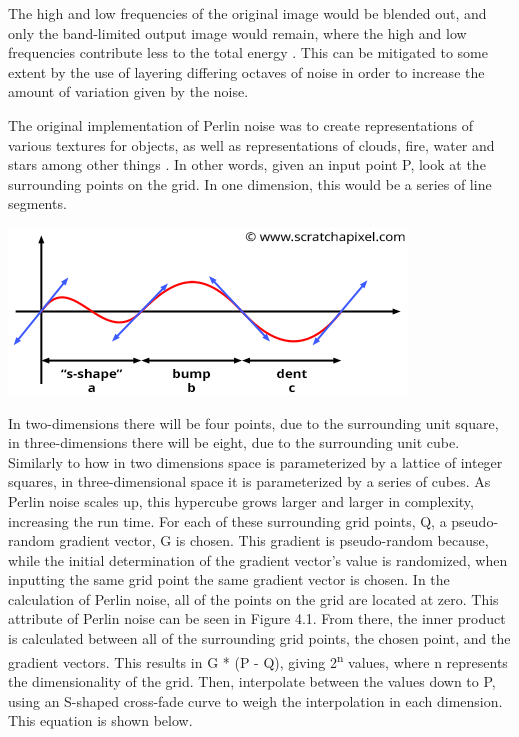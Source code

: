\documentclass[10pt]{report}
\begin{document}
		The high and low frequencies of the original image would be blended out, and only the band-limited output image would remain, where the high and low frequencies contribute less to the total energy \cite{making-noise}. This can be mitigated to some extent by the use of layering differing octaves of noise in order to increase the amount of variation given by the noise. 
		
		The original implementation of Perlin noise was to create representations of various textures for objects, as well as representations of clouds, fire, water and stars among other things \cite{10.1145/325165.325247}. In other words, given an input point P, look at the surrounding points on the grid. In one dimension, this would be a series of line segments. 

		\begin{minipage}{\textwidth}
			\centering
			\includegraphics[scale=.5]{noise-value-vs-perlin3}
			\label{fig:fig5}
		\end{minipage} 
		
		In two-dimensions there will be four points, due to the surrounding unit square, in three-dimensions there will be eight, due to the surrounding unit cube. Similarly to how in two dimensions space is parameterized by a lattice of integer squares, in three-dimensional space it is parameterized by a series of cubes. As Perlin noise scales up, this hypercube grows larger and larger in complexity, increasing the run time. For each of these surrounding grid points, Q, a pseudo-random gradient vector, G is chosen. This gradient is pseudo-random because, while the initial determination of the gradient vector's value is randomized, when inputting the same grid point the same gradient vector is chosen. In the calculation of Perlin noise, all of the points on the grid are located at zero. This attribute of Perlin noise can be seen in Figure 4.1. From there, the inner product is calculated between all of the surrounding grid points, the chosen point, and the gradient vectors. This results in G * (P - Q), giving 2\textsuperscript{n} values, where n represents the dimensionality of the grid. Then, interpolate between the values down to P, using an S-shaped cross-fade curve to weigh the interpolation in each dimension. This equation is shown below.
		
\end{document}
